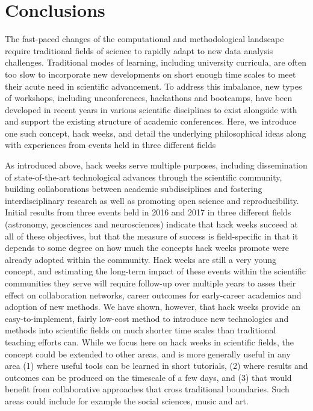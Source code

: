 
\section*{Conclusions}

The fast-paced changes of the computational and methodological landscape require traditional fields of science to rapidly adapt to new data analysis challenges.
Traditional modes of learning, including university curricula, are often too slow to incorporate new developments on short enough time scales to meet their acute need in scientific advancement.
To address this imbalance, new types of workshops, including unconferences, hackathons and bootcamps, have been developed in recent years in various scientific disciplines to exist alongside with and support the existing structure of academic conferences.
Here, we introduce one such concept, hack weeks, and detail the underlying philosophical ideas along with experiences from events held in three different fields

As introduced above, hack weeks serve multiple purposes, including dissemination of state-of-the-art technological advances through the scientific community, building collaborations between academic subdisciplines and fostering interdisciplinary research as well as  promoting open science and reproducibility.
Initial results from three events held in 2016 and 2017 in three different fields (astronomy, geosciences and neurosciences) indicate that hack weeks succeed at all of these objectives, but that the measure of success is field-specific in that it depends to some degree on how much the concepts hack weeks promote were already adopted within the community.
Hack weeks are still a very young concept, and estimating the long-term impact of these events within the scientific communities they serve will require follow-up over multiple years to asses their effect on collaboration networks, career outcomes for early-career academics and adoption of new methods.
We have shown, however, that hack weeks provide an easy-to-implement, fairly low-cost method to introduce new technologies and methods into scientific fields on much shorter time scales than traditional teaching efforts can.
While we focus here on hack weeks in scientific fields, the concept could be extended to other areas, and is more generally useful in any area (1) where useful tools can be learned in short tutorials, (2) where results and outcomes can be produced on the timescale of a few days, and (3) that would benefit from collaborative approaches that cross traditional boundaries. Such areas could include for example the social sciences, music and art.
